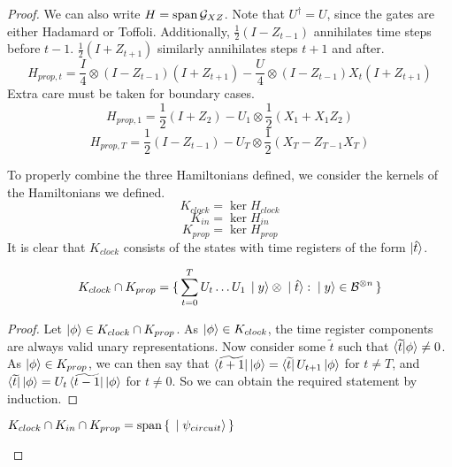 \begin{proof}
	We can also write $H=\operatorname*{\operatorname{span}}\mathcal{G}_{XZ}$. Note that $U^\dagger=U$, since the gates are either Hadamard or Toffoli. Additionally, $\frac{1}{2}(I-Z_{t-1})$ annihilates time steps before $t-1$. $\frac{1}{2}(I+Z_{t+1})$ similarly annihilates steps $t+1$ and after.
	$$H_{prop,t}=\frac{I}{4}\otimes(I-Z_{t-1})(I+Z_{t+1})-\frac{U}{4}\otimes(I-Z_{t-1})X_t(I+Z_{t+1})$$
	Extra care must be taken for boundary cases.
	$$H_{prop,1}=\frac{1}{2}(I+Z_2)-U_1\otimes\frac{1}{2}(X_1+X_1Z_2)$$
	$$H_{prop,T}=\frac{1}{2}(I-Z_{t-1})-U_T\otimes\frac{1}{2}(X_T-Z_{T-1}X_T)$$

	To properly combine the three Hamiltonians defined, we consider the kernels of the Hamiltonians we defined.
	$$K_{clock}=\ker H_{clock}$$
	$$K_{in}=\ker H_{in}$$
	$$K_{prop}=\ker H_{prop}$$
	It is clear that $K_{clock}$ consists of the states with time registers of the form $\ket{\hat{t}}$.

	\begin{lemma}
		$$K_{clock}\cap K_{prop}=\set{\sum_{t=0}^TU_t\ldots U_1\ket{y}\otimes\ket{\hat{t}}: \ket{y}\in\mathcal{B}^{\otimes n}}$$
	\end{lemma}

	\begin{proof}
		Let $\ket\phi\in K_{clock}\cap K_{prop}$. As $\ket\phi\in K_{clock}$, the time register components are always valid unary representations. Now consider some $\widetilde{t}$ such that $\braket{\widetilde{t}|\phi}\ne0$. As $\ket\phi\in K_{prop}$, we can then say that $\bra{\widetilde{t+1}}\ket\phi=\bra{\widetilde{t}}U_{t+1}\ket\phi$ for $t\ne T$, and $\bra{\widetilde{t}}\ket\phi=U_t\bra{\widetilde{t-1}}\ket\phi$ for $t\ne0$. So we can obtain the required statement by induction.
	\end{proof}

	\begin{corollary}
		$K_{clock}\cap K_{in}\cap K_{prop}=\operatorname*{\operatorname{span}}\set{\ket{\psi_{circuit}}}$
	\end{corollary}


\end{proof}
